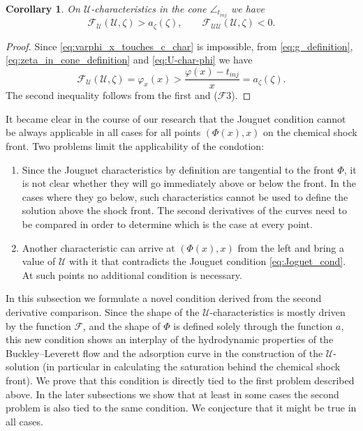\documentclass[12pt]{article}
\newtheorem{corollary}{Corollary}
\theoremstyle{definition}
\begin{document}
\begin{corollary}
\label{corollary:F-deriv-est-in-cone}
On $\mathcal U$-characteristics in the cone $\angle_{t_{inj}}$ we have
\[
\mathcal F_{\mathcal U} (\mathcal U, \zeta) > a_\zeta(\zeta), \qquad \mathcal F_{\mathcal U \mathcal U}(\mathcal U, \zeta) < 0.
\]
\end{corollary}
\begin{proof}
Since \eqref{eq:varphi_x_touches_c_char} is impossible, from \eqref{eq:g_definition}, \eqref{eq:zeta_in_cone_definition} and \eqref{eq:U-char-phi} we have
\[
\mathcal F_{\mathcal U} (\mathcal U, \zeta) = \varphi_x(x) > \dfrac{\varphi(x) - t_{inj}}{x} = a_\zeta(\zeta).
\]
The second inequality follows from the first and ($\mathcal{F}3$).
\end{proof}

It became clear in the course of our research that the Jouguet condition cannot be always applicable in all cases for all points $(\Phi(x), x)$ on the chemical shock front. Two problems limit the applicability of the condotion:
\begin{enumerate}
    \item Since the Jouguet characteristics by definition are tangential to the front $\Phi$, it is not clear whether they will go immediately above or below the front. In the cases where they go below, such characteristics cannot be used to define the solution above the shock front. The second derivatives of the curves need to be compared in order to determine which is the case at every point.
    \item Another characteristic can arrive at $(\Phi(x), x)$ from the left and bring a value of $\mathcal U$ with it that contradicts the Jouguet condition \eqref{eq:Joguet_cond}. At such points no additional condition is necessary.
\end{enumerate}

In this subsection we formulate a novel condition derived from the second derivative comparison. Since the shape of the $\mathcal U$-characteristics is mostly driven by the function $\mathcal F$, and the shape of $\Phi$ is defined solely through the function $a$, this new condition shows an interplay of the hydrodynamic properties of the Buckley--Leverett flow and the adsorption curve in the construction of the $\mathcal U$-solution (in particular in calculating the saturation behind the chemical shock front).
We prove that this condition is directly tied to the first problem described above. In the later subsections we show that at least in some cases the second problem is also tied to the same condition. We conjecture that it might be true in all cases.
\end{document}
